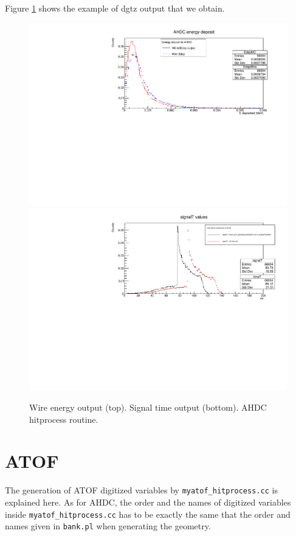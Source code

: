 	Figure \ref{fig:ahdc_dgtz} shows the example of dgtz output that we obtain.
\begin{figure}[H]
	\centering
	\includegraphics[width=1.0\textwidth]{AHDC_Edep_dgtzOptions.pdf}
	\includegraphics[width=1.0\textwidth]{signalT_ahdc.pdf}
	\caption{Wire energy output (top). Signal time output (bottom). AHDC hitprocess routine.}
	\label{fig:ahdc_dgtz}
\end{figure}	


\newpage
\section{ATOF}
The generation of ATOF digitized variables by \texttt{myatof\_hitprocess.cc} is explained here. As for AHDC, the order and the names of digitized variables inside \texttt{myatof\_hitprocess.cc} has to be exactly the same that the order and names given in  \texttt{bank.pl} when generating the geometry.

